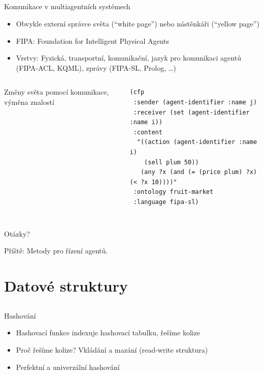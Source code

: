 \documentclass{beamer}
\begin{document}
\subsection{}
\begin{frame}[fragile]{Komunikace v multiagentních systémech}
\begin{itemize}
\item Obvykle externí správce světa (``white page'') nebo nástěnkáři (``yellow page'')
\item FIPA: Foundation for Intelligent Physical Agents
\item Vrstvy: Fyzická, transportní, komunikační, jazyk pro komunikaci agentů (FIPA-ACL, KQML), zprávy (FIPA-SL, Prolog, \dots)
\end{itemize}
\begin{columns}
\begin{column}{4cm}
Změny světa pomocí komunikace, výměna znalostí
\end{column}
\begin{column}[fragile]{7cm}
\begin{lstlisting}
(cfp
 :sender (agent-identifier :name j)
 :receiver (set (agent-identifier :name i))
 :content
  "((action (agent-identifier :name i)
    (sell plum 50))
   (any ?x (and (= (price plum) ?x) (< ?x 10))))"
 :ontology fruit-market
 :language fipa-sl)
\end{lstlisting}
\end{column}
\end{columns}
\end{frame}

\subsection{}
\begin{frame}{Otázky?}
\begin{center}
Příště: Metody pro řízení agentů.
\end{center}
\end{frame}

\section{Datové struktury}

\subsection{}
\begin{frame}{Hashování}
\begin{itemize}
\item Hashovací funkce indexuje hashovací tabulku, řešíme kolize
\item Proč řešíme kolize? Vkládání a mazání (read-write struktura)
\item Perfektní a univerzální hashování
\end{itemize}
\end{frame}
\end{document}
